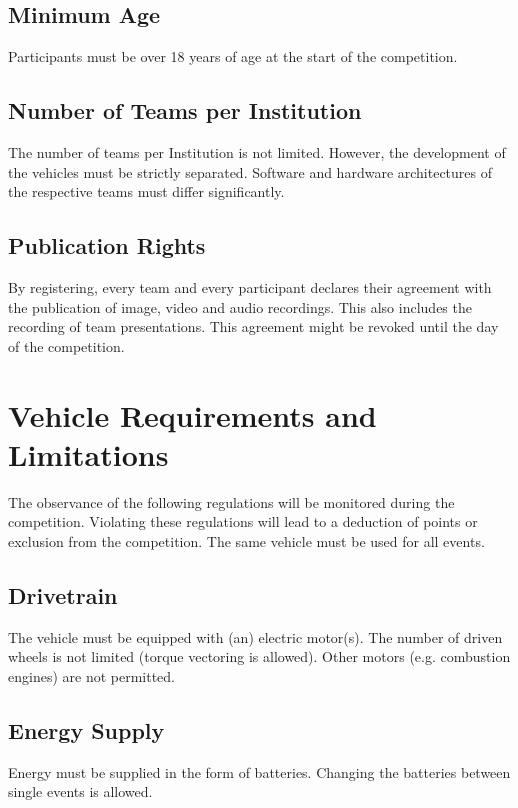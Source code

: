 \documentclass[a4paper]{report}
\begin{document}
\section{Minimum Age}

Participants must be over 18 years of age at the start of the competition. 

\section{Number of Teams per Institution}

The number of teams per Institution is not limited. However, the development of the vehicles must be strictly separated. Software and hardware architectures of the respective teams must differ significantly. 

\section{Publication Rights}

By registering, every team and every participant declares their agreement with the publication of image, video and audio recordings. This also includes the recording of team presentations. This agreement might be revoked until the day of the competition. 

\chapter{Vehicle Requirements and Limitations}

The observance of the following regulations will be monitored during the competition. Violating these regulations will lead to a deduction of points or exclusion from the competition. The same vehicle must be used for all events. 

\section{Drivetrain}

The vehicle must be equipped with (an) electric motor(s). The number of driven wheels is not limited (torque vectoring is allowed). Other motors (e.g. combustion engines) are not permitted. 

\section{Energy Supply}

Energy must be supplied in the form of batteries. Changing the batteries between single events is allowed. 
\end{document}
